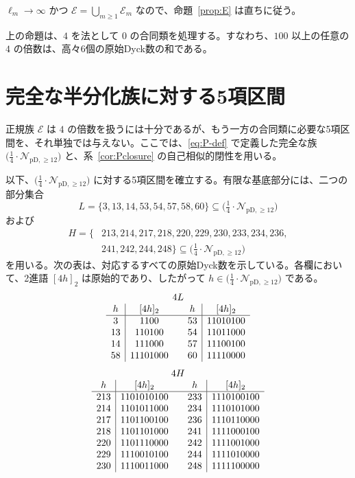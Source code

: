 \documentclass[12pt]{ltjsarticle}
\theoremstyle{plain}
\theoremstyle{definition}
\theoremstyle{plain}
\newcommand{\Pset}{%
  \bigl(\tfrac{1}{4}\cdot\mathcal{N}_{\mathrm{pD},\geq 12}\bigr)%
}
\begin{document}
$\ell_m\to\infty$ かつ $\mathcal E=\bigcup_{m\geq1}\mathcal E_m$ なので、命題~\ref{prop:E} は直ちに従う。

上の命題は、$4$ を法として $0$ の合同類を処理する。すなわち、$100$ 以上の任意の $4$ の倍数は、高々6個の原始Dyck数の和である。

\section{完全な半分化族に対する5項区間}
\label{sec:five-interval}

正規族 $\mathcal E$ は $4$ の倍数を扱うには十分であるが、もう一方の合同類に必要な5項区間を、それ単独では与えない。ここでは、\eqref{eq:P-def} で定義した完全な族 $\Pset$ と、系~\ref{cor:Pclosure} の自己相似的閉性を用いる。

以下、$\Pset$ に対する5項区間を確立する。有限な基底部分には、二つの部分集合
\begin{equation}\label{eq:L-def}
 L=\{3,13,14,53,54,57,58,60\}\subseteq\Pset
\end{equation}
および
\begin{equation}\label{eq:H-def}
\begin{split}
 H=\{&213,214,217,218,220,229,230,233,234,236,\\
     &241,242,244,248\}\subseteq\Pset
\end{split}
\end{equation}
を用いる。次の表は、対応するすべての原始Dyck数を示している。各欄において、2進語 $[4h]_2$ は原始的であり、したがって $h\in\Pset$ である。
\[
\begin{array}{c|c@{\qquad}c|c}
\multicolumn{4}{c}{4L}\\
h&[4h]_2&h&[4h]_2\\ \hline
3&1100&53&11010100\\
13&110100&54&11011000\\
14&111000&57&11100100\\
58&11101000&60&11110000
\end{array}
\]
\[
\begin{array}{c|c@{\qquad}c|c}
\multicolumn{4}{c}{4H}\\
h&[4h]_2&h&[4h]_2\\ \hline
213&1101010100&233&1110100100\\
214&1101011000&234&1110101000\\
217&1101100100&236&1110110000\\
218&1101101000&241&1111000100\\
220&1101110000&242&1111001000\\
229&1110010100&244&1111010000\\
230&1110011000&248&1111100000
\end{array}
\]
\end{document}
